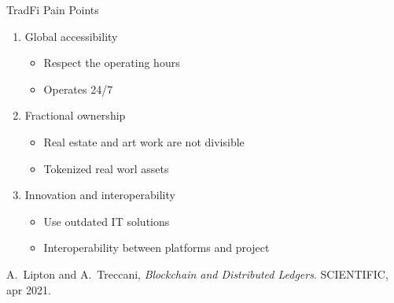 \documentclass{beamer}
\begin{document}
\begin{frame}[allowframebreaks]{TradFi Pain Points}
\begin{enumerate}
  \item Global accessibility
    \begin{itemize}
    \scriptsize
    \item[TradFi] Respect the operating hours
    \item[DeFi] Operates 24/7
  \end{itemize}
  
  \item Fractional ownership
      \begin{itemize}
    \scriptsize
    \item[TradFi] Real estate and art work are not divisible
    \item[DeFi] Tokenized real worl assets
  \end{itemize}
  
  \item Innovation and interoperability
     \begin{itemize}
    \scriptsize
    \item[TradFi] Use outdated IT solutions
    \item[DeFi] Interoperability between platforms and project
  \end{itemize}
\end{enumerate}
\begin{thebibliography}{1}

A.~Lipton and A.~Treccani, {\em Blockchain and Distributed Ledgers}.
 {SCIENTIFIC}, apr 2021.

\end{thebibliography}

\end{frame}
\end{document}
